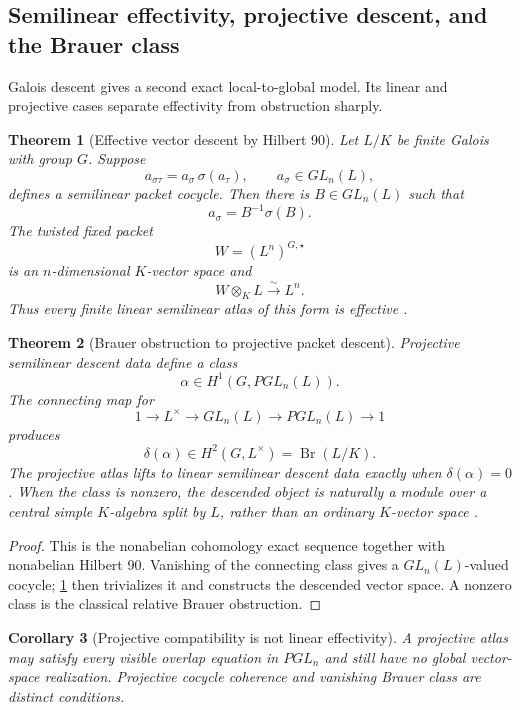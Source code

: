 \documentclass[11pt]{article}
\newtheorem{theorem}{Theorem}[section]
\newtheorem{corollary}[theorem]{Corollary}
\theoremstyle{definition}
\theoremstyle{remark}
\DeclareMathOperator{\Br}{Br}
\begin{document}
\subsection{Semilinear effectivity, projective descent, and the Brauer class}
\label{subsec:brauer-descent}

Galois descent gives a second exact local-to-global model.  Its linear and projective cases separate effectivity from obstruction sharply.

\begin{theorem}[Effective vector descent by Hilbert 90]
\label{thm:block02-hilbert90}
Let \(L/K\) be finite Galois with group \(G\).  Suppose
\[
a_{\sigma\tau}=a_\sigma\,\sigma(a_\tau),
\qquad
a_\sigma\in GL_n(L),
\]
defines a semilinear packet cocycle.  Then there is \(B\in GL_n(L)\) such that
\[
a_\sigma=B^{-1}\sigma(B).
\]
The twisted fixed packet
\[
W=(L^n)^{G,\star}
\]
is an \(n\)-dimensional \(K\)-vector space and
\[
W\otimes_KL\xrightarrow{\sim}L^n.
\]
Thus every finite linear semilinear atlas of this form is effective \cite{GAL}.
\end{theorem}

\begin{theorem}[Brauer obstruction to projective packet descent]
\label{thm:block02-brauer}
Projective semilinear descent data define a class
\[
\alpha\in H^1(G,PGL_n(L)).
\]
The connecting map for
\[
1\longrightarrow L^\times
\longrightarrow GL_n(L)
\longrightarrow PGL_n(L)
\longrightarrow1
\]
produces
\[
\delta(\alpha)
\in
H^2(G,L^\times)
=
\Br(L/K).
\]
The projective atlas lifts to linear semilinear descent data exactly when \(\delta(\alpha)=0\).  When the class is nonzero, the descended object is naturally a module over a central simple \(K\)-algebra split by \(L\), rather than an ordinary \(K\)-vector space \cite{GAL}.
\end{theorem}

\begin{proof}
This is the nonabelian cohomology exact sequence together with nonabelian Hilbert 90.  Vanishing of the connecting class gives a \(GL_n(L)\)-valued cocycle; \cref{thm:block02-hilbert90} then trivializes it and constructs the descended vector space.  A nonzero class is the classical relative Brauer obstruction.
\end{proof}

\begin{corollary}[Projective compatibility is not linear effectivity]
\label{cor:projective-not-linear-effectivity}
A projective atlas may satisfy every visible overlap equation in \(PGL_n\) and still have no global vector-space realization.  Projective cocycle coherence and vanishing Brauer class are distinct conditions.
\end{corollary}
\end{document}
